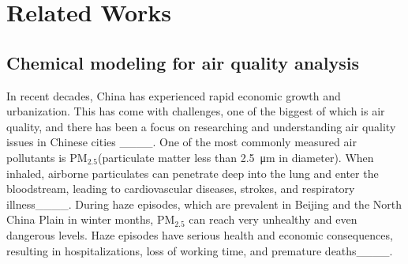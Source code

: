 \section{Related Works}
\label{related_work}
\subsection{Chemical modeling for air quality analysis}
In recent decades, China has experienced rapid economic growth and urbanization. This has come with challenges, one of the biggest of which is air quality, and there has been a focus on researching and understanding air quality issues in Chinese cities ____. One of the most commonly measured air pollutants is PM\(_{2.5}\)(particulate matter less than \SI{2.5}{\micro\meter} in diameter). When inhaled, airborne particulates can penetrate deep into the lung and enter the bloodstream, leading to cardiovascular diseases, strokes, and respiratory illness____. During haze episodes, which are prevalent in Beijing and the North China Plain in winter months, PM$_{2.5}$ can reach very unhealthy and even dangerous levels. Haze episodes have serious health and economic consequences, resulting in hospitalizations, loss of working time, and premature deaths____.



